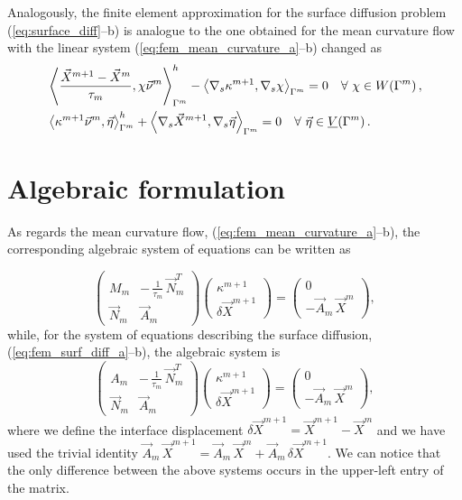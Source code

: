 Analogously, the finite element approximation for the surface diffusion problem
(\ref{eq:surface_diff}--b) is analogue to the one obtained for the mean
curvature flow with the linear system (\ref{eq:fem_mean_curvature_a}--b)
changed as
\begin{subequations}
\begin{align}
&\left\langle \frac{\vec{X}^{m + 1} - \vec{X}^{m}}{\tau_m},
\chi\vec{\nu}^m\right\rangle_{\Gamma^m}^{h} - \left\langle\nabla_s\kappa^{m+1},
\nabla_s\chi\right\rangle_{\Gamma^m}=0\quad \forall\ \chi \in
W(\Gamma^m)\,,\label{eq:fem_surf_diff_a}\\
&\left\langle\kappa^{m+1}\vec{\nu}^m, \vec{\eta}\right\rangle_{\Gamma^m}^{h} +
\left\langle\nabla_s\vec{X}^{m + 1},
\nabla_s\vec{\eta}\right\rangle_{\Gamma^m}=0\quad \forall\ \vec\eta \in \underline{V}(\Gamma^m)\,.
\label{eq:fem_surf_diff_b}
\end{align}
\end{subequations}

\section[Algebraic formulation]{Algebraic formulation}
As regards the mean curvature flow, (\ref{eq:fem_mean_curvature_a}--b), the
corresponding algebraic system of equations can be written as

\begin{equation}\label{eq:algebraic_mean_curvature}
\begin{pmatrix}
M_m & -\,\frac{1}{\tau_m} \, \vec{N}_{m}^{T} \\
\vec{N}_m & \vec{A}_m
\end{pmatrix}
\begin{pmatrix}
\kappa^{m + 1} \\
\delta \vec{X}^{m + 1}
\end{pmatrix}
=
\begin{pmatrix}
0 \\
- \vec{A}_m \, \vec{X}^{m}
\end{pmatrix} ,
\end{equation}
while, for the system of equations describing the surface diffusion,
(\ref{eq:fem_surf_diff_a}--b), the algebraic system is
\begin{equation}\label{eq:algebraic_surf_diff}
\begin{pmatrix}
A_m & - \,\frac{1}{\tau_m}\, \vec{N}_{m}^{T} \\
\vec{N}_m & \vec{A}_m
\end{pmatrix}
\begin{pmatrix}
\kappa^{m + 1} \\
\delta \vec{X}^{m + 1}
\end{pmatrix}
=
\begin{pmatrix}
0 \\
- \vec{A}_m \, \vec{X}^{m}
\end{pmatrix},
\end{equation}
where we define the interface displacement $\delta \vec{X}^{m + 1}=\vec{X}^{m +
1} - \vec{X}^{m}$ and we have used the trivial identity $\vec{A}_m\,\vec{X}^{m
+ 1} = \vec{A}_m\,\vec{X}^{m}+\vec{A}_m\,\delta \vec{X}^{m + 1} $. We can
notice that the only difference between the above systems occurs in the
upper-left entry of the matrix.

